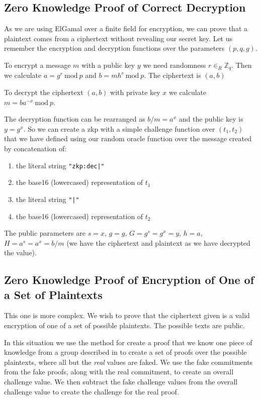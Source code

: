 \subsection*{Zero Knowledge Proof of Correct Decryption}
\label{proc:zkp:dec}

As we are using ElGamal over a finite field for encryption, we can prove that a plaintext comes from a ciphertext without revealing our secret key. Let us remember the encryption and decryption functions over the parameters $(p,q,g)$.

To encrypt a message $m$ with a public key $y$ we need randomness $r \in_{R} \mathbb{Z}_q$. Then we calculate $a = g^r\ \textrm{mod}\ p$ and $b = mh^r\ \textrm{mod}\ p$. The ciphertext is $(a,b)$

To decrypt the ciphertext $(a,b)$ with private key $x$ we calculate $m = ba^{-x}\ \textrm{mod}\ p$.

The decryption function can be rearranged as $b/m = a^x$ and the public key is $y = g^x$. So we can create a \gls{zkp} with a simple challenge function over $(t_1, t_2)$ that we have defined using our random oracle function over the message created by concatenation of:

\begin{enumerate}
    \item the literal string \lstinline[style=ES6]{"zkp:dec|"}
    \item the base16 (lowercased) representation of $t_1$
    \item the literal string \lstinline[style=ES6]{"|"}
    \item the base16 (lowercased) representation of $t_2$
\end{enumerate}

The public parameters are $s = x$, $g = g$, $G = g^s = g^x = y$, $h = a$, $H = a^s = a^x = b/m$ (we have the ciphertext and plaintext as we have decrypted the value).


\subsection*{Zero Knowledge Proof of Encryption of One of a Set of Plaintexts}
\label{proc:zkp:enc}

This one is more complex. We wish to prove that the ciphertext given is a valid encryption of one of a set of possible plaintexts. The possible texts are public.

In this situation we use the method for create a proof that we know one piece of knowledge from a group described in \cite{camenischProofSystemsGeneral} to create a set of proofs over the possible plaintexts, where all but the \emph{real} values are faked. We use the fake commitments from the fake proofs, along with the real commitment, to create an overall challenge value. We then subtract the fake challenge values from the overall challenge value to create the challenge for the real proof.

